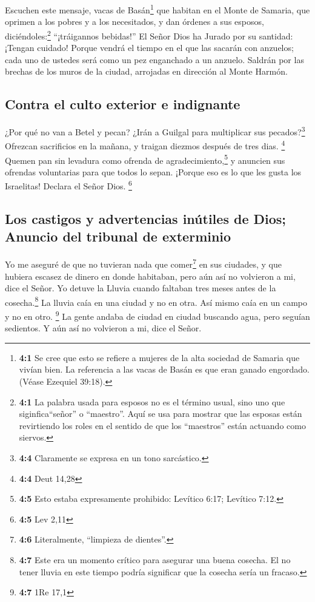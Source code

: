  Escuchen este mensaje, vacas de Basán\footnote{\textbf{4:1}
  Se cree que esto se refiere a mujeres de la alta sociedad de Samaria
  que vivían bien. La referencia a las vacas de Basán es que eran ganado
  engordado. (Véase Ezequiel 39:18).} que habitan en el Monte de
Samaria, que oprimen a los pobres y a los necesitados, y dan órdenes a
sus esposos, diciéndoles:\footnote{\textbf{4:1} La palabra usada para
  esposos no es el término usual, sino uno que siginfica``señor'' o
  ``maestro''. Aquí se usa para mostrar que las esposas están
  revirtiendo los roles en el sentido de que los ``maestros'' están
  actuando como siervos.} ``¡tráigannos bebidas!''  El
Señor Dios ha Jurado por su santidad: ¡Tengan cuidado! Porque vendrá el
tiempo en el que las sacarán con anzuelos; cada uno de ustedes será como
un pez enganchado a un anzuelo.  Saldrán por las brechas
de los muros de la ciudad, arrojadas en dirección al Monte Harmón.

\hypertarget{contra-el-culto-exterior-e-indignante}{%
\subsection{Contra el culto exterior e
indignante}\label{contra-el-culto-exterior-e-indignante}}

 ¿Por qué no van a Betel y pecan? ¿Irán a Guilgal para
multiplicar sus pecados?\footnote{\textbf{4:4} Claramente se expresa en
  un tono sarcástico.} Ofrezcan sacrificios en la mañana, y traigan
diezmos después de tres dias. \footnote{\textbf{4:4} Deut 14,28}
 Quemen pan sin levadura como ofrenda de
agradecimiento,\footnote{\textbf{4:5} Esto estaba expresamente
  prohibido: Levítico 6:17; Levítico 7:12.} y anuncien sus ofrendas
voluntarias para que todos lo sepan. ¡Porque eso es lo que les gusta los
Israelitas! Declara el Señor Dios. \footnote{\textbf{4:5} Lev 2,11}

\hypertarget{los-castigos-y-advertencias-inuxfatiles-de-dios-anuncio-del-tribunal-de-exterminio}{%
\subsection{Los castigos y advertencias inútiles de Dios; Anuncio del
tribunal de
exterminio}\label{los-castigos-y-advertencias-inuxfatiles-de-dios-anuncio-del-tribunal-de-exterminio}}

 Yo me aseguré de que no tuvieran nada que
comer\footnote{\textbf{4:6} Literalmente, ``limpieza de dientes''.} en
sus ciudades, y que hubiera escasez de dinero en donde habitaban, pero
aún así no volvieron a mi, dice el Señor.  Yo detuve la
Lluvia cuando faltaban tres meses antes de la cosecha.\footnote{\textbf{4:7}
  Este era un momento crítico para asegurar una buena cosecha. El no
  tener lluvia en este tiempo podría significar que la cosecha sería un
  fracaso.} La lluvia caía en una ciudad y no en otra. Así mismo caía en
un campo y no en otro. \footnote{\textbf{4:7} 1Re 17,1} 
La gente andaba de ciudad en ciudad buscando agua, pero seguían
sedientos. Y aún así no volvieron a mi, dice el Señor.

